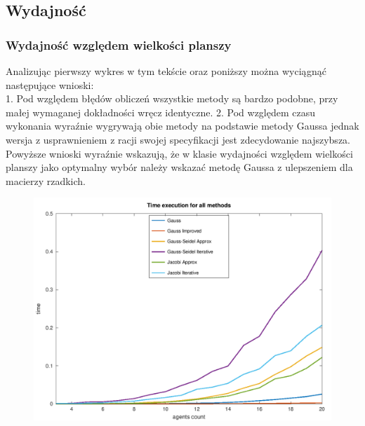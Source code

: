 \documentclass[10pt]{article}
\begin{document}
\subsection {Wydajność}
\subsubsection{Wydajność względem wielkości planszy}
Analizując pierwszy wykres w tym tekście oraz poniższy można wyciągnąć następujące wnioski:\\
1. Pod względem błędów obliczeń wszystkie metody są bardzo podobne, przy małej wymaganej dokładności wręcz identyczne.
2. Pod względem czasu wykonania wyraźnie wygrywają obie metody na podstawie metody Gaussa jednak wersja z usprawnieniem z racji swojej specyfikacji jest zdecydowanie najszybsza.
\\
Powyższe wnioski wyraźnie wskazują, że w klasie wydajności względem wielkości planszy jako optymalny wybór należy wskazać metodę Gaussa z ulepszeniem dla macierzy rzadkich.
\begin{figure}[h]
\centering
\includegraphics[scale=0.75]{plots/02_time_execution_all_methods.png}
\end{figure}
\newpage
\end{document}
